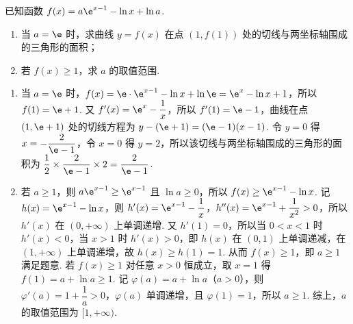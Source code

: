 \begin{problem}
已知函数 \(f(x)=a\e^{x-1}-\ln x+\ln a\).

\begin{enumerate}
\item 当 \(a=\e\) 时，求曲线 \(y=f(x)\) 在点 \((1,f(1))\) 处的切线与两坐标轴围成的三角形的面积；
\item 若 \(f(x)\geqslant1\)，求 \(a\) 的取值范围.
\end{enumerate}
\end{problem}

\begin{solution}
\begin{enumerate}
\item 当 \(a=\e\) 时，\(f(x)=\e\cdot\e^{x-1}-\ln x+\ln\e=\e^x-\ln x+1\)，所以 \(f(1)=\e+1\). 又 \(f'(x)=\e^x-\dfrac1x\)，所以 \(f'(1)=\e-1\)，曲线在点 \((1,\e+1)\) 处的切线方程为 \(y-(\e+1)=(\e-1)(x-1)\). 令 \(y=0\) 得 \(x=-\dfrac{2}{\e-1}\)，令 \(x=0\) 得 \(y=2\)，所以该切线与两坐标轴围成的三角形的面积为 \(\dfrac12\times\dfrac{2}{\e-1}\times2=\dfrac{2}{\e-1}\).
\item 若 \(a\ge1\)，则 \(a\e^{x-1}\ge\e^{x-1}\) 且 \(\ln a\ge0\)，所以 \(f(x)\ge\e^{x-1}-\ln x\). 记 \(h(x)=\e^{x-1}-\ln x\)，则 \(h'(x)=\e^{x-1}-\dfrac1x\)，\(h''(x)=\e^{x-1}+\dfrac1{x^2}>0\)，所以 \(h'(x)\) 在 \((0,+\infty)\) 上单调递增. 又 \(h'(1)=0\)，所以当 \(0<x<1\) 时 \(h'(x)<0\)，当 \(x>1\) 时 \(h'(x)>0\)，即 \(h(x)\) 在 \((0,1)\) 上单调递减，在 \((1,+\infty)\) 上单调递增，故 \(h(x)\ge h(1)=1\). 从而 \(f(x)\ge1\)，即 \(a\ge1\) 满足题意.
若 \(f(x)\ge1\) 对任意 \(x>0\) 恒成立，取 \(x=1\) 得 \(f(1)=a+\ln a\ge1\). 记 \(\varphi(a)=a+\ln a\)（\(a>0\)），则 \(\varphi'(a)=1+\dfrac1a>0\)，\(\varphi(a)\) 单调递增，且 \(\varphi(1)=1\)，所以 \(a\ge1\). 综上，\(a\) 的取值范围为 \([1,+\infty)\).
\end{enumerate}
\end{solution}
